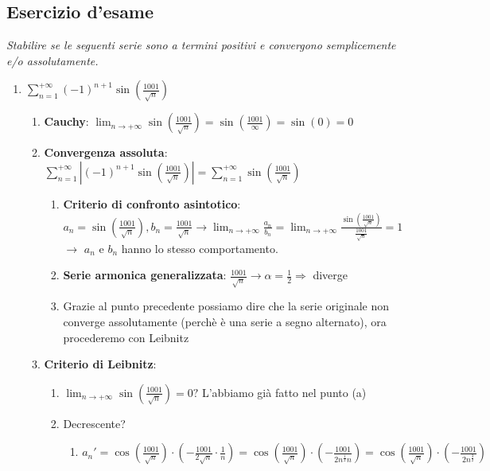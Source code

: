 \documentclass[10pt, a4paper]{article}
\begin{document}
    \newpage
    \subsection{Esercizio d'esame}
        \textit{Stabilire se le seguenti serie sono a termini positivi e convergono semplicemente e/o assolutamente.}
        \begin{enumerate}
            \item $\sum_{n=1}^{+\infty}(-1)^{n+1}\sin\left(\frac{1001}{\sqrt{n}}\right)$ 
            \begin{enumerate}
                \item \textbf{Cauchy}: $\lim_{n\rightarrow+\infty}\sin\left(\frac{1001}{\sqrt{n}}\right)=\sin\left(\frac{1001}{\infty}\right)=\sin(0)=0$
                \item \textbf{Convergenza assoluta}: $\sum_{n=1}^{+\infty}\left|(-1)^{n+1}\sin\left(\frac{1001}{\sqrt{n}}\right)\right|=\sum_{n=1}^{+\infty}\sin\left(\frac{1001}{\sqrt{n}}\right)$ 
                    \begin{enumerate}
                        \item \textbf{Criterio di confronto asintotico}: \scriptsize$a_n = \sin\left(\frac{1001}{\sqrt{n}}\right), b_n = \frac{1001}{\sqrt{n}} \rightarrow \lim_{n\rightarrow+\infty}\frac{a_n}{b_n}=\lim_{n\rightarrow+\infty}\frac{\sin\left(\frac{1001}{\sqrt{n}}\right)}{\frac{1001}{\sqrt{n}}}=1$\normalsize \\ $\rightarrow$ $a_n$ e $b_n$ hanno lo stesso comportamento.
                        \item \textbf{Serie armonica generalizzata}: $\frac{1001}{\sqrt{n}}\rightarrow\alpha=\frac{1}{2}\Rightarrow$ diverge
                        \item Grazie al punto precedente possiamo dire che la serie originale non converge assolutamente (perchè è una serie a segno alternato), ora procederemo con Leibnitz
                    \end{enumerate}
                \item \textbf{Criterio di Leibnitz}: 
                    \begin{enumerate}
                        \item $\lim_{n\rightarrow+\infty}\sin\left(\frac{1001}{\sqrt{n}}\right)=0?$ L'abbiamo già fatto nel punto (a)
                        \item Decrescente? \begin{enumerate}
                        \item $a_n'=\cos\left(\frac{1001}{\sqrt{n}}\right)\cdot\left(-\frac{1001}{2\sqrt{n}}\cdot\frac{1}{n}\right)=\cos\left(\frac{1001}{\sqrt{n}}\right)\cdot\left(-\frac{1001}{2n^{\frac{1}{2}}n}\right)=\cos\left(\frac{1001}{\sqrt{n}}\right)\cdot\left(-\frac{1001}{2n^{\frac{3}{2}}}\right)$

\end{enumerate}
\end{enumerate}
\end{enumerate}
\end{enumerate}
\end{document}
